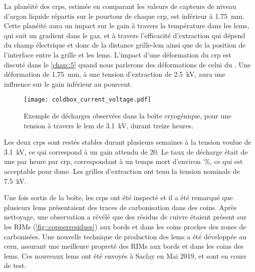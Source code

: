       La planéité des \glspl{crp}, estimée en comparant les valeurs de capteurs de niveau d'argon liquide répartis sur le pourtour de chaque \gls{crp}, est inférieur à \SI{1.75}{\milli\meter}. Cette planéité aura un impact sur le gain à travers la température dans les \glspl{lem}, qui suit un gradient dans le gaz, et à travers l'efficacité d'extraction qui dépend du champ électrique et donc de la distance grille-\gls{lem} ainsi que de la position de l'interface entre la grille et les \glspl{lem}. L'impact d'une déformation du \gls{crp} est discuté dans le \autoref{chap::5} quand nous parlerons des déformations de celui du \TOO{}. Une déformation de \SI{1.75}{\milli\meter}, à une tension d'extraction de \SI{2.5}{\kilo\volt}, aura une influence sur le gain inférieur au pourcent.

      \begin{figure}[htpb]
        \centering
        \texttt{[image: coldbox\_current\_voltage.pdf]}
        \caption[Décharges observées dans la boîte cryogénique]{\label{fig::coldbox_current_voltage}Exemple de décharges observées dans la boîte cryogénique, pour une tension à travers le \gls{lem} de \SI{3.1}{\kilo\volt}, durant treize heures.}
      \end{figure}
    
      Les deux \glspl{crp} sont restés stables durant plusieurs semaines à la tension voulue de \SI{3.1}{\kilo\volt}, ce qui correspond à un gain attendu de 20. Le taux de décharge était de une par heure par \gls{crp}, correspondant à un temps mort d'environ \,\%, ce qui est acceptable pour \gls{dune}. Les grilles d'extraction ont tenu la tension nominale de \SI{7.5}{\kilo\volt}. 

      Une fois sortis de la boîte, les \glspl{crp} ont été inspecté et il a été remarqué que plusieurs \glspl{lem} présentaient des traces de carbonisation dans des coins. Après nettoyage, une observation a révélé que des résidus de cuivre étaient présent sur les RIMs (\autoref{fig::copperresidues}) aux bords et dans les coins proches des zones de carbonisées. Une nouvelle technique de production des \glspl{lem} a été développée au \gls{cern}, assurant une meilleure propreté des RIMs aux bords et dans les coins des \glspl{lem}. Ces nouveaux \glspl{lem} ont été envoyés à Saclay en Mai 2019, et sont en cours de test.

        
